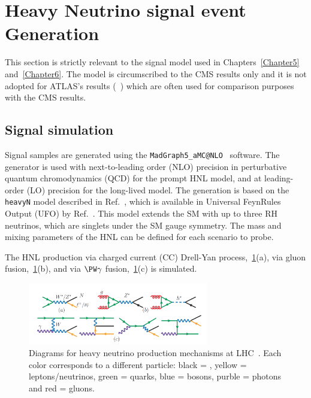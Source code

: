 \clearpage
\section{Heavy Neutrino signal event Generation}\label{sec:c4hnl}
This section is strictly relevant to the signal model used in
Chapters~\ref{Chapter5} and~\ref{Chapter6}. The model is circumscribed to the
CMS results only and it is not adopted for ATLAS's
results (~\cite{atlasintro2}) which are often used for comparison
purposes with the CMS results.



\subsection{Signal simulation}\label{sec:c4hnlmodel}

Signal samples are generated using the
\texttt{MadGraph5\_aMC@NLO}~\cite{Alwall_2014} software. 
The generator is used with next-to-leading order (NLO) precision
in perturbative quantum chromodynamics (QCD) for the prompt HNL
model, and at leading-order (LO) precision for the long-lived model.
The generation is based on the \texttt{heavyN} model described in
Ref.~\cite{Atre:2009rg}, which is available in Universal FeynRules
Output (UFO) by Ref.~\cite{Alva:2014gxa,Degrande_2016,heavyN}.
This model extends the SM with up to three RH neutrinos,
which are singlets under the SM gauge symmetry.
The mass and mixing parameters of the HNL can be defined for each
scenario to probe.

The HNL production via charged current (CC) Drell-Yan
process,~\ref{fid:hnl_production}(a), via gluon
fusion,~\ref{fid:hnl_production}(b), and via $\PW \gamma$
fusion,~\ref{fid:hnl_production}(c) is simulated. 
\begin{figure}[h!]
\centering
 \includegraphics[clip,trim=0cm 0cm 0cm 1cm, width=0.70\textwidth]{Figures/c4/hnl_production}
  \caption{Diagrams for heavy neutrino production mechanisms at
    LHC~\cite{Pascoli_2019}. Each color corresponds to a different
    particle: black = \hnl, yellow = leptons/neutrinos, green =
    quarks, blue = bosons, purble = photons and red = gluons.}
  \label{fid:hnl_production}
\end{figure}

